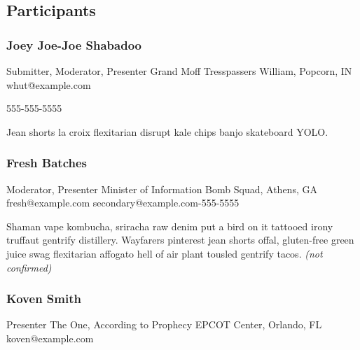 \documentclass{report}
\begin{document}
            \subsection*{Participants}
              \subsubsection*{ Joey Joe-Joe Shabadoo }
              Submitter, Moderator, Presenter\newline
              Grand Moff\newline
              Tresspassers William, Popcorn, IN
              \newline
              whut@example.com\newline
              
              555-555-5555\newline

              Jean shorts la croix flexitarian disrupt kale chips banjo skateboard YOLO.\newline


              
                \subsubsection*{ Fresh Batches }
                Moderator, Presenter\newline
                Minister of Information\newline
                Bomb Squad, Athens, GA
                \newline
                fresh@example.com\newline
                secondary@example.com-555-5555\newline

                Shaman vape kombucha, sriracha raw denim put a bird on it tattooed irony truffaut gentrify distillery. Wayfarers pinterest jean shorts offal, gluten-free green juice swag flexitarian affogato hell of air plant tousled gentrify tacos.\newline
                \emph{ (not confirmed) }
              

              
                \subsubsection*{ Koven Smith }
                Presenter\newline
                The One, According to Prophecy\newline
                EPCOT Center, Orlando, FL
                \newline
                koven@example.com\newline
                
\end{document}
